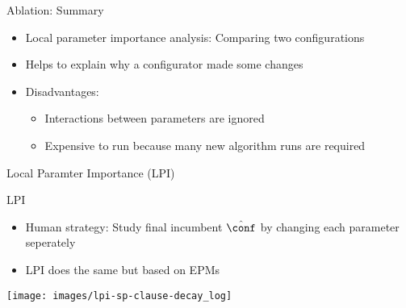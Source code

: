 \begin{frame}[c]{Ablation: Summary}

\begin{itemize}
  \item Local parameter importance analysis: Comparing two configurations
  \pause
  \medskip
  \item Helps to explain why a configurator made some changes
  \pause
  \medskip
  \item Disadvantages:
  \begin{itemize}
    \item Interactions between parameters are ignored
    \item Expensive to run because many new algorithm runs are required
  \end{itemize}
\end{itemize}

\end{frame}
\begin{frame}[c]{Local Paramter Importance (LPI)~}

\begin{block}{LPI}
\begin{itemize}
  \item Human strategy: Study final incumbent $\hat{\conf}$ by changing each parameter seperately
  \smallskip
  \pause
  \item LPI does the same but based on EPMs 
\end{itemize}

\centering
\texttt{[image: images/lpi-sp-clause-decay\_log]}
\end{block}

\end{frame}
